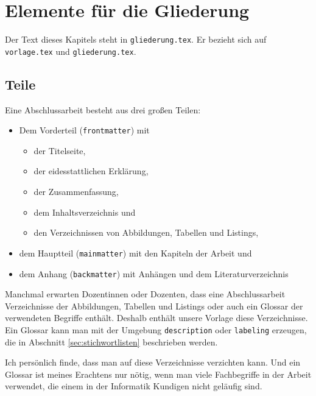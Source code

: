%

\chapter{Elemente für die Gliederung}

Der Text dieses Kapitels steht in \verb=gliederung.tex=. Er bezieht sich
auf \verb=vorlage.tex= und \verb=gliederung.tex=.

\section{Teile}

Eine Abschlussarbeit besteht aus drei großen Teilen:

\begin{itemize}
	\item Dem Vorderteil (\verb=frontmatter=) mit
		\begin{itemize}
			\item der Titelseite,
			\item der eidesstattlichen Erklärung,
			\item der Zusammenfassung,
			\item dem Inhaltsverzeichnis und
			\item den Verzeichnissen von Abbildungen, Tabellen und Listings,
		\end{itemize}
	\item dem Hauptteil (\verb=mainmatter=) mit den Kapiteln der Arbeit
		und
	\item dem Anhang (\verb=backmatter=) mit Anhängen und dem
		Literaturverzeichnis	
\end{itemize}

Manchmal erwarten Dozentinnen oder Dozenten, dass eine Abschlussarbeit
Verzeichnisse der Abbildungen, Tabellen und Listings oder auch ein Glossar
der verwendeten Begriffe enthält. Deshalb enthält unsere Vorlage diese
Verzeichnisse. Ein Glossar kann man mit der Umgebung \verb=description=
oder \verb=labeling= erzeugen, die in Abschnitt
\ref{sec:stichwortlisten}  beschrieben werden.

Ich persönlich finde, dass man auf diese Verzeichnisse verzichten kann.
Und ein Glossar ist meines Erachtens nur nötig, wenn man viele
Fachbegriffe in der Arbeit verwendet, die einem in der Informatik
Kundigen nicht geläufig sind.

